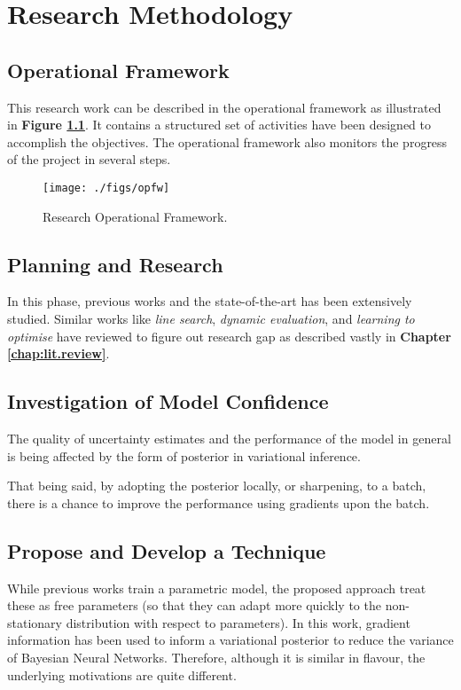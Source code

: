 \chapter{Research Methodology}
\label{chap:method}

\section{Operational Framework}
This research work can be described in the operational framework as illustrated in \textbf{Figure \ref{fig:opfw}}. It contains a structured set of activities have been designed to accomplish the objectives. The operational framework also monitors the progress of the project in several steps.

\begin{figure}[p]
	\centering
	\texttt{[image: ./figs/opfw]}
	\caption[Research Operational Framework]{Research Operational Framework.}
	\label{fig:opfw}
\end{figure}

\section{Planning and Research}
In this phase, previous works and the state-of-the-art has been extensively studied. Similar works like \textit{line search}, \textit{dynamic evaluation}, and \textit{learning to optimise} have reviewed to figure out research gap as described vastly in \textbf{Chapter \ref{chap:lit.review}}.

\section{Investigation of Model Confidence}
The quality of uncertainty estimates and the performance of the model in general is being affected by the form of posterior in variational inference.

That being said, by adopting the posterior locally, or sharpening, to a batch, there is a chance to improve the performance using gradients upon the batch.

\section{Propose and Develop a Technique}
While previous works train a parametric model, the proposed approach treat these as free parameters (so that they can adapt more quickly to the non-stationary distribution with respect to parameters). In this work, gradient information has been used to inform a variational posterior to reduce the variance of Bayesian Neural Networks. Therefore, although it is similar in flavour, the underlying motivations are quite different.


